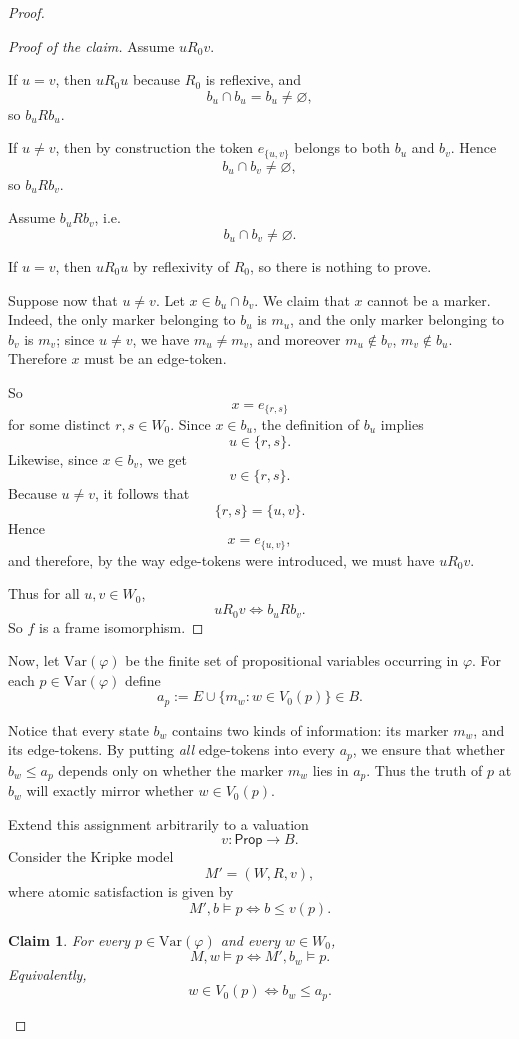 \documentclass[11pt]{amsart}
\theoremstyle{definition}
\theoremstyle{plain}
\newtheorem{claim}[definition]{Claim}
\newcommand{\Prop}{\mathsf{Prop}}
\begin{document}
\begin{proof}
\begin{proof}[Proof of the claim]
Assume $uR_0v$.

If $u=v$, then $uR_0u$ because $R_0$ is reflexive, and
\[
b_u\cap b_u=b_u\neq\varnothing,
\]
so $b_uRb_u$.

If $u\neq v$, then by construction the token $e_{\{u,v\}}$ belongs to both $b_u$ and $b_v$.
Hence
\[
b_u\cap b_v\neq\varnothing,
\]
so $b_uRb_v$.


Assume $b_uRb_v$, i.e.
\[
b_u\cap b_v\neq\varnothing.
\]

If $u=v$, then $uR_0u$ by reflexivity of $R_0$, so there is nothing to prove.

Suppose now that $u\neq v$. Let $x\in b_u\cap b_v$. We claim that $x$ cannot be a marker.
Indeed, the only marker belonging to $b_u$ is $m_u$, and the only marker belonging to $b_v$ is
$m_v$; since $u\neq v$, we have $m_u\neq m_v$, and moreover $m_u\notin b_v$, $m_v\notin b_u$.
Therefore $x$ must be an edge-token.

So
\[
x=e_{\{r,s\}}
\]
for some distinct $r,s\in W_0$. Since $x\in b_u$, the definition of $b_u$ implies
\[
u\in\{r,s\}.
\]
Likewise, since $x\in b_v$, we get
\[
v\in\{r,s\}.
\]
Because $u\neq v$, it follows that
\[
\{r,s\}=\{u,v\}.
\]
Hence
\[
x=e_{\{u,v\}},
\]
and therefore, by the way edge-tokens were introduced, we must have $uR_0v$.

Thus for all $u,v\in W_0$,
\[
uR_0v \iff b_uRb_v.
\]
So $f$ is a frame isomorphism.
\end{proof}



Now, let $\mathrm{Var}(\varphi)$ be the finite set of propositional variables occurring in $\varphi$.
For each $p\in \mathrm{Var}(\varphi)$ define
\[
a_p:=E\cup\{m_w:w\in V_0(p)\}\in B.
\]

Notice that every state $b_w$ contains two kinds of information:
its marker $m_w$, and its edge-tokens.
By putting \emph{all} edge-tokens into every $a_p$, we ensure that whether $b_w\leq a_p$ depends
only on whether the marker $m_w$ lies in $a_p$. Thus the truth of $p$ at $b_w$ will exactly
mirror whether $w\in V_0(p)$.

Extend this assignment arbitrarily to a valuation
\[
v:\Prop\to B.
\]
Consider the Kripke model
\[
M'=(W,R,v),
\]
where atomic satisfaction is given by
\[
M',b\models p \iff b\leq v(p).
\]

\begin{claim}
For every $p\in \mathrm{Var}(\varphi)$ and every $w\in W_0$,
\[
M,w\models p \iff M',b_w\models p.
\]
Equivalently,
\[
w\in V_0(p) \iff b_w\leq a_p.
\]
\end{claim}


\end{proof}
\end{document}
